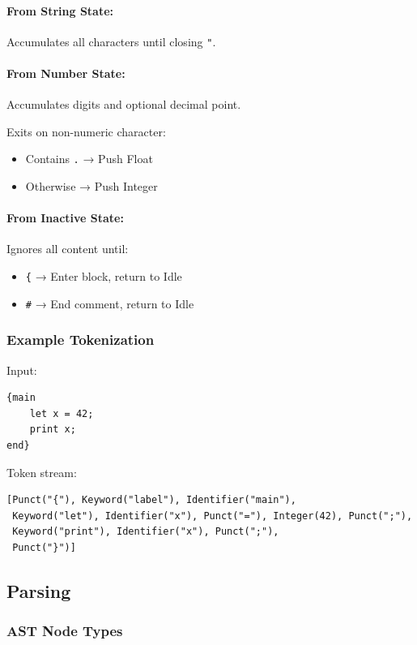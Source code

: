 \documentclass[11pt,a4paper]{article}
\begin{document}
\paragraph{From String State:}
Accumulates all characters until closing \texttt{"}.

\paragraph{From Number State:}
Accumulates digits and optional decimal point.

Exits on non-numeric character:
\begin{itemize}
    \item Contains \texttt{.} → Push Float
    \item Otherwise → Push Integer
\end{itemize}

\paragraph{From Inactive State:}
Ignores all content until:
\begin{itemize}
    \item \texttt{\{} → Enter block, return to Idle
    \item \texttt{\#} → End comment, return to Idle
\end{itemize}

\subsubsection{Example Tokenization}

Input:
\begin{verbatim}
{main
    let x = 42;
    print x;
end}
\end{verbatim}

Token stream:
\begin{verbatim}
[Punct("{"), Keyword("label"), Identifier("main"),
 Keyword("let"), Identifier("x"), Punct("="), Integer(42), Punct(";"),
 Keyword("print"), Identifier("x"), Punct(";"),
 Punct("}")]
\end{verbatim}

\subsection{Parsing}

\subsubsection{AST Node Types}
\end{document}
